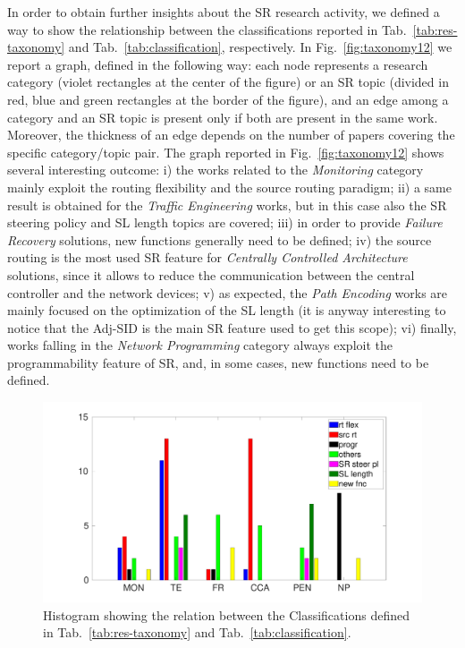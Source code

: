 In order to obtain further insights about the SR research activity, we defined a way to show the relationship between the classifications reported in Tab.~\ref{tab:res-taxonomy} and Tab.~\ref{tab:classification}, respectively. In Fig.~\ref{fig:taxonomy12} we report a graph, defined in the following way: each node represents a research category (violet rectangles at the center of the figure) or an SR topic (divided in red, blue and green rectangles at the border of the figure), and an edge among a category and an SR topic is present only if both are present in the same work. Moreover, the thickness of an edge depends on the number of papers covering the specific category/topic pair. The graph reported in Fig.~\ref{fig:taxonomy12} shows several interesting outcome: i) the works related to the \emph{Monitoring} category mainly exploit the routing flexibility and the source routing paradigm; ii) a same result is obtained for the \emph{Traffic Engineering} works, but in this case also the SR steering policy and SL length topics are covered; iii) in order to provide \emph{Failure Recovery} solutions, new functions generally need to be defined; iv) the source routing is the most used SR feature for \emph{Centrally Controlled Architecture} solutions, since it allows to reduce the communication between the central controller and the network devices; v) as expected, the \emph{Path Encoding}  works are mainly focused on the optimization of the SL length (it is anyway interesting to notice that the Adj-SID is the main SR feature used to get this scope); vi) finally, works falling in the \emph{Network Programming} category always exploit the programmability feature of SR, and, in some cases, new functions need to be defined.

\begin{figure}
    \centering
    \includegraphics[trim=4cm 1.2cm 4cm 1cm,clip, width=1\columnwidth]{fig/taxonomy_1-2c-new.pdf}
    \caption{Histogram showing the relation between the Classifications defined in Tab.~\ref{tab:res-taxonomy} and Tab.~\ref{tab:classification}.}
    \label{fig:taxonomy12b}
\end{figure}

